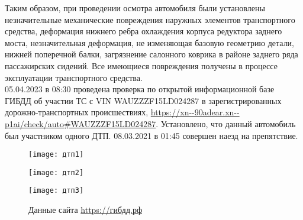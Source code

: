    Таким образом, при проведении  осмотра автомобиля были установлены незначительные механические повреждения наружных элементов  транспортного средства, деформация нижнего  ребра охлаждения корпуса редуктора заднего моста, незначительная деформация, не изменяющая базовую геометрию детали, нижней поперечной балки,   загрязнение салонного коврика в районе заднего ряда пассажирских сидений. Все имеющиеся повреждения  получены в процессе эксплуатации транспортного средства.\\
   05.04.2023 в 08:30  проведена проверка  по открытой информационной базе ГИБДД об участии ТС с VIN  WAUZZZF15LD024287 в зарегистрированных дорожно-транспортных происшествиях, \url{https://xn--90adear.xn--p1ai/check/auto#WAUZZZF15LD024287}. Установлено, что данный автомобиль был участником одного ДТП. 08.03.2021 в 01:45   совершен наезд на препятствие. 
   \begin{figure}[H]
   	\centering
   	\texttt{[image: дтп1]}
   \end{figure}
\begin{figure}[H]
	\centering
	\texttt{[image: дтп2]}
\end{figure}
\begin{figure}[H]
	\centering
	\texttt{[image: дтп3]}
	\caption{Данные сайта \url{https://гибдд.рф}}
	\label{гибдд}
\end{figure}  
   
